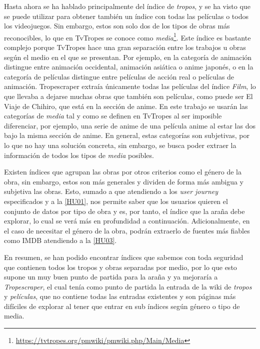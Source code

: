Hasta ahora se ha hablado principalmente del índice de \textit{tropos}, y se ha
visto que se puede utilizar para obtener también un índice con todas las
películas o todos los videojuegos. Sin embargo, estos son solo dos de los tipos
de obras más reconocibles, lo que en TvTropes se conoce como
\textit{media}\footnote{\url{https://tvtropes.org/pmwiki/pmwiki.php/Main/Media}}.
Este índice es bastante complejo porque TvTropes hace una gran separación entre
los trabajos u obras según el medio en el que se presentan. Por ejemplo, en la
categoría de animación distingue entre animación occidental, animación asiática
o anime japonés, o en la categoría de películas distingue entre películas de
acción real o películas de animación. Tropescraper extraía únicamente todas las
películas del índice \textit{Film}, lo que llevaba a dejarse muchas obras que
también son películas, como puede ser El Viaje de Chihiro, que está en la
sección de anime. En este trabajo se usarán las categorías de \textit{media} tal
y como se definen en TvTropes al ser imposible diferenciar, por ejemplo, una
serie de anime de una película anime al estar las dos bajo la misma sección de
anime. En general, estas categorías son subjetivas, por lo que no hay una
solución concreta, sin embargo, se busca poder extraer la información de todos
los tipos de \textit{media} posibles.

Existen índices que agrupan las obras por otros criterios como el género de la
obra, sin embargo, estos son más generales y dividen de forma más ambigua y
subjetiva las obras. Esto, sumado a que atendiendo a los \textit{user journey}
especificados y a la
\href{https://github.com/jlgallego99/TropesToGo/issues/6}{[HU01]}, nos permite
saber que los usuarios quieren el conjunto de datos por tipo de obra y es, por
tanto, el índice que la araña debe explorar, lo cual se verá más en profundidad
a continuación. Adicionalmente, en el caso de necesitar el género de la obra,
podrán extraerlo de fuentes más fiables como IMDB atendiendo a la
\href{https://github.com/jlgallego99/TropesToGo/issues/8}{[HU03]}.

En resumen, se han podido encontrar índices que sabemos con toda seguridad que
contienen todos los tropos y obras separadas por medio, por lo que esto supone
un muy buen punto de partida para la araña y ya mejoraría a
\textit{Tropescraper}, el cual tenía como punto de partida la entrada de la wiki
de \textit{tropos} y \textit{películas}, que no contiene todas las entradas
existentes y son páginas más difíciles de explorar al tener que entrar en sub
índices según género o tipo de media.

